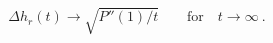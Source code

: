 \begin{equation}
\Delta h_r(t) \rightarrow \sqrt{P''(1)/t} \qquad 
              \mathrm{for}\quad t\rightarrow\infty\ .
\label{eq30}
\end{equation}

